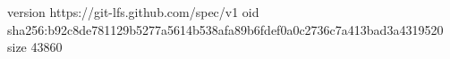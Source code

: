 version https://git-lfs.github.com/spec/v1
oid sha256:b92c8de781129b5277a5614b538afa89b6fdef0a0c2736c7a413bad3a4319520
size 43860

